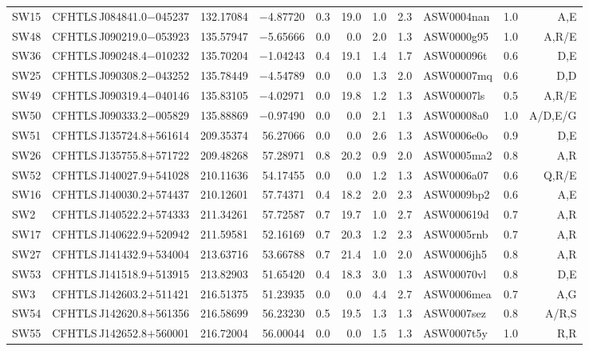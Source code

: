 \documentclass[useAMS,usenatbib,a4paper]{mn2e}
\begin{document}
\begin{center}
\begin{longtable}{llrrrrrrlrr}
SW15 & CFHTLS\,J084841.0$-$045237 & 132.17084 &  $-$4.87720 &  0.3 & 19.0 &  1.0 &  2.3 & ASW0004nan &  1.0 &  A,E   \\ 
SW48 & CFHTLS\,J090219.0$-$053923 & 135.57947 &  $-$5.65666 &  0.0 &  0.0 &  2.0 &  1.3 & ASW0000g95 &  1.0 &  A,R/E   \\ 
SW36 & CFHTLS\,J090248.4$-$010232 & 135.70204 &  $-$1.04243 &  0.4 & 19.1 &  1.4 &  1.7 & ASW000096t &  0.6 &  D,E   \\ 
SW25 & CFHTLS\,J090308.2$-$043252 & 135.78449 &  $-$4.54789 &  0.0 &  0.0 &  1.3 &  2.0 & ASW00007mq &  0.6 &  D,D   \\ 
SW49 & CFHTLS\,J090319.4$-$040146 & 135.83105 &  $-$4.02971 &  0.0 & 19.8 &  1.2 &  1.3 & ASW00007ls &  0.5 &  A,R/E   \\ 
SW50 & CFHTLS\,J090333.2$-$005829 & 135.88869 &  $-$0.97490 &  0.0 &  0.0 &  2.1 &  1.3 & ASW00008a0 &  1.0 &  A/D,E/G   \\ 
SW51 & CFHTLS\,J135724.8$+$561614 & 209.35374 &    56.27066 &  0.0 &  0.0 &  2.6 &  1.3 & ASW0006e0o &  0.9 &  D,E   \\ 
SW26 & CFHTLS\,J135755.8$+$571722 & 209.48268 &    57.28971 &  0.8 & 20.2 &  0.9 &  2.0 & ASW0005ma2 &  0.8 &  A,R   \\ 
SW52 & CFHTLS\,J140027.9$+$541028 & 210.11636 &    54.17455 &  0.0 &  0.0 &  1.2 &  1.3 & ASW0006a07 &  0.6 &  Q,R/E   \\ 
SW16 & CFHTLS\,J140030.2$+$574437 & 210.12601 &    57.74371 &  0.4 & 18.2 &  2.0 &  2.3 & ASW0009bp2 &  0.6 &  A,E   \\ 
SW2  & CFHTLS\,J140522.2$+$574333 & 211.34261 &    57.72587 &  0.7 & 19.7 &  1.0 &  2.7 & ASW000619d &  0.7 &  A,R   \\ 
SW17 & CFHTLS\,J140622.9$+$520942 & 211.59581 &    52.16169 &  0.7 & 20.3 &  1.2 &  2.3 & ASW0005rnb &  0.7 &  A,R   \\ 
SW27 & CFHTLS\,J141432.9$+$534004 & 213.63716 &    53.66788 &  0.7 & 21.4 &  1.0 &  2.0 & ASW0006jh5 &  0.8 &  A,R   \\ 
SW53 & CFHTLS\,J141518.9$+$513915 & 213.82903 &    51.65420 &  0.4 & 18.3 &  3.0 &  1.3 & ASW00070vl &  0.8 &  D,E   \\ 
SW3  & CFHTLS\,J142603.2$+$511421 & 216.51375 &    51.23935 &  0.0 &  0.0 &  4.4 &  2.7 & ASW0006mea &  0.7 &  A,G   \\ 
SW54 & CFHTLS\,J142620.8$+$561356 & 216.58699 &    56.23230 &  0.5 & 19.5 &  1.3 &  1.3 & ASW0007sez &  0.8 &  A/R,S   \\ 
SW55 & CFHTLS\,J142652.8$+$560001 & 216.72004 &    56.00044 &  0.0 &  0.0 &  1.5 &  1.3 & ASW0007t5y &  1.0 &  R,R   \\ 

\end{longtable}
\end{center}
\end{document}
